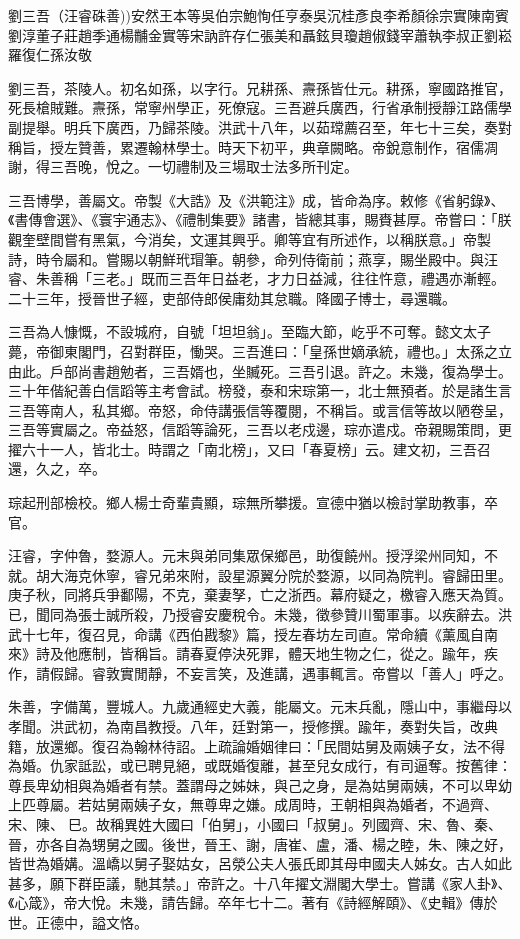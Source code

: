 
\begin{pinyinscope}
劉三吾（汪睿硃善))安然王本等吳伯宗鮑恂任亨泰吳沉桂彥良李希顏徐宗實陳南賓劉淳董子莊趙季通楊黼金實等宋訥許存仁張美和聶鉉貝瓊趙俶錢宰蕭執李叔正劉崧羅復仁孫汝敬

劉三吾，茶陵人。初名如孫，以字行。兄耕孫、燾孫皆仕元。耕孫，寧國路推官，死長槍賊難。燾孫，常寧州學正，死僚寇。三吾避兵廣西，行省承制授靜江路儒學副提舉。明兵下廣西，乃歸茶陵。洪武十八年，以茹瑺薦召至，年七十三矣，奏對稱旨，授左贊善，累遷翰林學士。時天下初平，典章闕略。帝銳意制作，宿儒凋謝，得三吾晚，悅之。一切禮制及三場取士法多所刊定。

三吾博學，善屬文。帝製《大誥》及《洪範注》成，皆命為序。敕修《省躬錄》、《書傳會選》、《寰宇通志》、《禮制集要》諸書，皆總其事，賜賚甚厚。帝嘗曰：「朕觀奎壁間嘗有黑氣，今消矣，文運其興乎。卿等宜有所述作，以稱朕意。」帝製詩，時令屬和。嘗賜以朝鮮玳瑁筆。朝參，命列侍衛前；燕享，賜坐殿中。與汪睿、朱善稱「三老。」既而三吾年日益老，才力日益減，往往忤意，禮遇亦漸輕。二十三年，授晉世子經，吏部侍郎侯庸劾其怠職。降國子博士，尋還職。

三吾為人慷慨，不設城府，自號「坦坦翁」。至臨大節，屹乎不可奪。懿文太子薨，帝御東閣門，召對群臣，慟哭。三吾進曰：「皇孫世嫡承統，禮也。」太孫之立由此。戶部尚書趙勉者，三吾婿也，坐贓死。三吾引退。許之。未幾，復為學士。三十年偕紀善白信蹈等主考會試。榜發，泰和宋琮第一，北士無預者。於是諸生言三吾等南人，私其鄉。帝怒，命侍講張信等覆閱，不稱旨。或言信等故以陋卷呈，三吾等實屬之。帝益怒，信蹈等論死，三吾以老戍邊，琮亦遣戍。帝親賜策問，更擢六十一人，皆北士。時謂之「南北榜」，又曰「春夏榜」云。建文初，三吾召還，久之，卒。

琮起刑部檢校。鄉人楊士奇輩貴顯，琮無所攀援。宣德中猶以檢討掌助教事，卒官。

汪睿，字仲魯，婺源人。元末與弟同集眾保鄉邑，助復饒州。授浮梁州同知，不就。胡大海克休寧，睿兄弟來附，設星源翼分院於婺源，以同為院判。睿歸田里。庚子秋，同將兵爭鄱陽，不克，棄妻孥，亡之浙西。幕府疑之，檄睿入應天為質。已，聞同為張士誠所殺，乃授睿安慶稅令。未幾，徵參贊川蜀軍事。以疾辭去。洪武十七年，復召見，命講《西伯戡黎》篇，授左春坊左司直。常命續《薰風自南來》詩及他應制，皆稱旨。請春夏停決死罪，體天地生物之仁，從之。踰年，疾作，請假歸。睿敦實閒靜，不妄言笑，及進講，遇事輒言。帝嘗以「善人」呼之。

朱善，字備萬，豐城人。九歲通經史大義，能屬文。元末兵亂，隱山中，事繼母以孝聞。洪武初，為南昌教授。八年，廷對第一，授修撰。踰年，奏對失旨，改典籍，放還鄉。復召為翰林待詔。上疏論婚姻律曰：「民間姑舅及兩姨子女，法不得為婚。仇家詆訟，或已聘見絕，或既婚復離，甚至兒女成行，有司逼奪。按舊律：尊長卑幼相與為婚者有禁。蓋謂母之姊妹，與己之身，是為姑舅兩姨，不可以卑幼上匹尊屬。若姑舅兩姨子女，無尊卑之嫌。成周時，王朝相與為婚者，不過齊、宋、陳、巳。故稱異姓大國曰「伯舅」，小國曰「叔舅」。列國齊、宋、魯、秦、晉，亦各自為甥舅之國。後世，晉王、謝，唐崔、盧，潘、楊之睦，朱、陳之好，皆世為婚媾。溫嶠以舅子娶姑女，呂滎公夫人張氏即其母申國夫人姊女。古人如此甚多，願下群臣議，馳其禁。」帝許之。十八年擢文淵閣大學士。嘗講《家人卦》、《心箴》，帝大悅。未幾，請告歸。卒年七十二。著有《詩經解頤》、《史輯》傳於世。正德中，謚文恪。


\end{pinyinscope}
